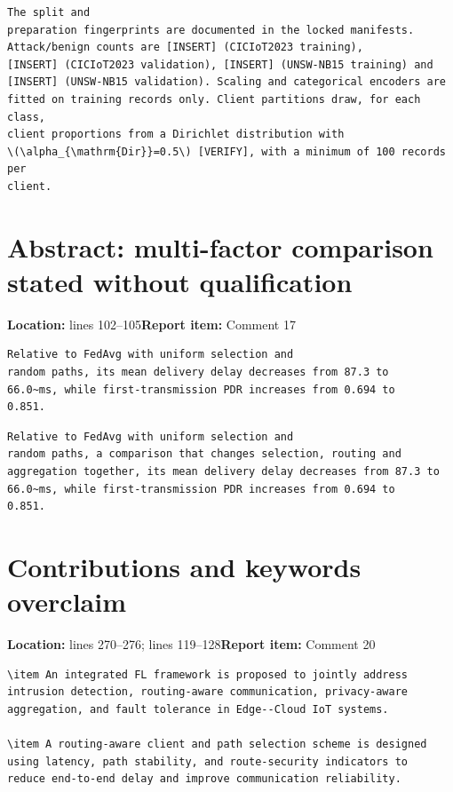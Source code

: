 \documentclass[10pt,a4paper]{article}
\newcommand{\issue}[3]{\section{#1}{\raggedright\noindent\textcolor{note}{\small\textbf{Location:} #2\quad\textbf{Report item:} #3}\par}\smallskip}
\begin{document}
\begin{after}
\begin{Verbatim}
The split and
preparation fingerprints are documented in the locked manifests.
Attack/benign counts are [INSERT] (CICIoT2023 training),
[INSERT] (CICIoT2023 validation), [INSERT] (UNSW-NB15 training) and
[INSERT] (UNSW-NB15 validation). Scaling and categorical encoders are
fitted on training records only. Client partitions draw, for each class,
client proportions from a Dirichlet distribution with
\(\alpha_{\mathrm{Dir}}=0.5\) [VERIFY], with a minimum of 100 records per
client.
\end{Verbatim}
\end{after}

\issue{Abstract: multi-factor comparison stated without qualification}{lines 102--105}{Comment 17}

\begin{before}[lines 102--105]
\begin{Verbatim}
Relative to FedAvg with uniform selection and
random paths, its mean delivery delay decreases from 87.3 to
66.0~ms, while first-transmission PDR increases from 0.694 to
0.851.
\end{Verbatim}
\end{before}

\begin{after}
\begin{Verbatim}
Relative to FedAvg with uniform selection and
random paths, a comparison that changes selection, routing and
aggregation together, its mean delivery delay decreases from 87.3 to
66.0~ms, while first-transmission PDR increases from 0.694 to
0.851.
\end{Verbatim}
\end{after}

\issue{Contributions and keywords overclaim}{lines 270--276; lines 119--128}{Comment 20}

\begin{before}[lines 270--276]
\begin{Verbatim}
\item An integrated FL framework is proposed to jointly address
intrusion detection, routing-aware communication, privacy-aware
aggregation, and fault tolerance in Edge--Cloud IoT systems.

\item A routing-aware client and path selection scheme is designed
using latency, path stability, and route-security indicators to
reduce end-to-end delay and improve communication reliability.
\end{Verbatim}
\end{before}
\end{document}
